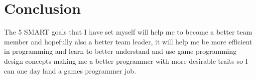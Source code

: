 \documentclass{scrartcl}
\begin{document}

\section{Conclusion}
The 5 SMART goals that I have set myself will help me to become a better team member and hopefully also a better team leader, it will help me be more efficient in programming and learn to better understand and use game programming design concepts making me a better programmer with more desirable traits so I can one day land a games programmer job.





\end{document}
